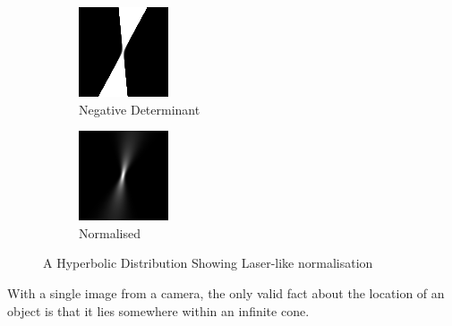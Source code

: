 \documentclass[a4paper, 11pt, titlepage]{article}
\begin{document}
      \begin{figure}
      \centering
      \begin{subfigure}{.5\textwidth}
        \centering
        \includegraphics[width=.7\linewidth]{images/GaussianRay1.png}
        \caption{Negative Determinant}
        \label{fig:hyperbolicsub1}
      \end{subfigure}%
      \begin{subfigure}{.5\textwidth}
        \centering
        \includegraphics[width=.7\linewidth]{images/GaussianRay2.png}
        \caption{Normalised}
        \label{fig:hyperbolicsub2}
      \end{subfigure}
      \caption{A Hyperbolic Distribution Showing Laser-like normalisation}
      \label{fig:hyperbolic}
      \end{figure}
      With a single image from a camera, the only valid fact about the location of an object is that it lies somewhere within an infinite cone.
\end{document}
